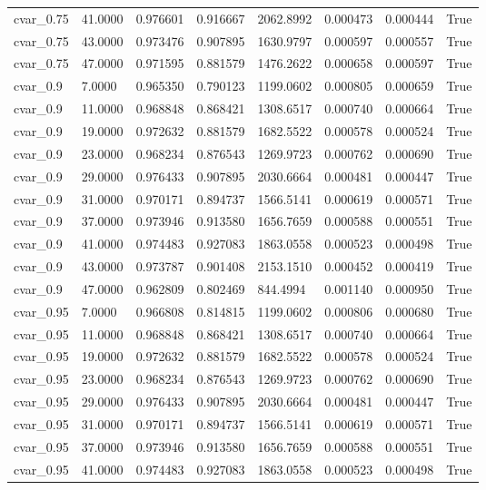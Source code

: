 \documentclass[11pt]{report}
\begin{document}
\begin{longtable}{llllllll}
cvar\_0.75 & 41.0000 & 0.976601 & 0.916667 & 2062.8992 & 0.000473 & 0.000444 & True \\
cvar\_0.75 & 43.0000 & 0.973476 & 0.907895 & 1630.9797 & 0.000597 & 0.000557 & True \\
cvar\_0.75 & 47.0000 & 0.971595 & 0.881579 & 1476.2622 & 0.000658 & 0.000597 & True \\
cvar\_0.9 & 7.0000 & 0.965350 & 0.790123 & 1199.0602 & 0.000805 & 0.000659 & True \\
cvar\_0.9 & 11.0000 & 0.968848 & 0.868421 & 1308.6517 & 0.000740 & 0.000664 & True \\
cvar\_0.9 & 19.0000 & 0.972632 & 0.881579 & 1682.5522 & 0.000578 & 0.000524 & True \\
cvar\_0.9 & 23.0000 & 0.968234 & 0.876543 & 1269.9723 & 0.000762 & 0.000690 & True \\
cvar\_0.9 & 29.0000 & 0.976433 & 0.907895 & 2030.6664 & 0.000481 & 0.000447 & True \\
cvar\_0.9 & 31.0000 & 0.970171 & 0.894737 & 1566.5141 & 0.000619 & 0.000571 & True \\
cvar\_0.9 & 37.0000 & 0.973946 & 0.913580 & 1656.7659 & 0.000588 & 0.000551 & True \\
cvar\_0.9 & 41.0000 & 0.974483 & 0.927083 & 1863.0558 & 0.000523 & 0.000498 & True \\
cvar\_0.9 & 43.0000 & 0.973787 & 0.901408 & 2153.1510 & 0.000452 & 0.000419 & True \\
cvar\_0.9 & 47.0000 & 0.962809 & 0.802469 & 844.4994 & 0.001140 & 0.000950 & True \\
cvar\_0.95 & 7.0000 & 0.966808 & 0.814815 & 1199.0602 & 0.000806 & 0.000680 & True \\
cvar\_0.95 & 11.0000 & 0.968848 & 0.868421 & 1308.6517 & 0.000740 & 0.000664 & True \\
cvar\_0.95 & 19.0000 & 0.972632 & 0.881579 & 1682.5522 & 0.000578 & 0.000524 & True \\
cvar\_0.95 & 23.0000 & 0.968234 & 0.876543 & 1269.9723 & 0.000762 & 0.000690 & True \\
cvar\_0.95 & 29.0000 & 0.976433 & 0.907895 & 2030.6664 & 0.000481 & 0.000447 & True \\
cvar\_0.95 & 31.0000 & 0.970171 & 0.894737 & 1566.5141 & 0.000619 & 0.000571 & True \\
cvar\_0.95 & 37.0000 & 0.973946 & 0.913580 & 1656.7659 & 0.000588 & 0.000551 & True \\
cvar\_0.95 & 41.0000 & 0.974483 & 0.927083 & 1863.0558 & 0.000523 & 0.000498 & True \\

\end{longtable}
\end{document}
